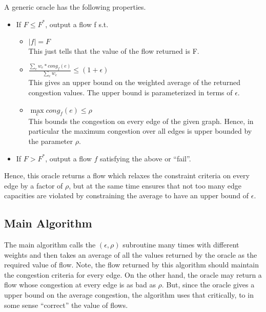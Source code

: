 \documentclass[BTech]{iitmdiss}
\begin{document}
	    A generic oracle has the following properties.
	    \begin{itemize}
	     \item 
	      If $F \leq F^{\ast}$, output a flow f s.t. \\
	      
		\begin{itemize}
		 \item 
		    $  \mid f \mid = F$ \\
		    
		    This just tells that the value of the flow returned is F. \\
		 \item
		    $\frac{\sum\limits_{e} w_e \ast cong_f(e)}{\sum\limits_{e} w_e} \leq (1+\epsilon)$ \\
		    
		    This gives an upper bound on the weighted average of the returned congestion values. The upper bound is parameterized in terms
		    of $\epsilon$. \\
		    
		 \item
		    $\max\limits_{e} cong_f(e) \leq \rho$ \\
		    
		    This bounds the congestion on every edge of the given graph. Hence, in particular the maximum congestion over all edges is 
		    upper bounded by the parameter $\rho$.
		\end{itemize}

	     \item
		If $F > F^{\ast}$, output a flow $f$ satisfying the above or ``fail''.
	  \end{itemize}
	    Hence, this oracle returns a flow which relaxes the constraint criteria on every edge by a factor of $\rho$, but at the same time ensures
	    that not too many edge capacities are violated by constraining the average to have an upper bound of $\epsilon$.
	    
	  \subsection{Main Algorithm}
	      The main algorithm calls the $(\epsilon,\rho)$ subroutine many times with different weights and then takes an average of all the values
	      returned by the oracle as the required value of flow. Note, the flow returned by this algorithm should maintain the congestion criteria
	      for every edge. On the other hand, the oracle may return a flow whose congestion at every edge is as bad as $\rho$. But, since
	      the oracle gives a upper bound on the average congestion, the algorithm uses that critically, to in some sense ``correct'' the value of 
	      flows. \\
	      
\end{document}
